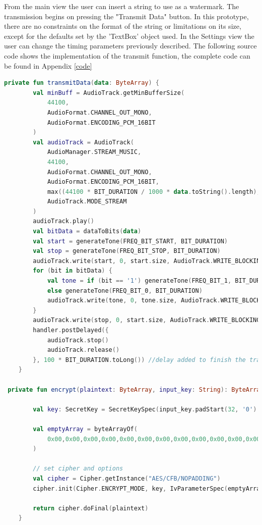 From the main view the user can insert a string to use as a watermark. The transmission begins on pressing the "Transmit Data" button. In this prototype, there are no constraints on the format of the string or limitations on its size, except for the defaults set by the 'TextBox' object used.
In the Settings view the user can change the timing parameters previously described. The following source code shows the implementation of the transmit function, the complete code can be found in Appendix \ref{code}

\begin{lstlisting}[language=Kotlin, caption=Code of the Transmit and encrypt Function.]        
    private fun transmitData(data: ByteArray) {
        val minBuff = AudioTrack.getMinBufferSize(
            44100,
            AudioFormat.CHANNEL_OUT_MONO,
            AudioFormat.ENCODING_PCM_16BIT
        )
        val audioTrack = AudioTrack(
            AudioManager.STREAM_MUSIC,
            44100,
            AudioFormat.CHANNEL_OUT_MONO,
            AudioFormat.ENCODING_PCM_16BIT,
            max((44100 * BIT_DURATION / 1000 * data.toString().length), minBuff),
            AudioTrack.MODE_STREAM
        )
        audioTrack.play()
        val bitData = dataToBits(data)
        val start = generateTone(FREQ_BIT_START, BIT_DURATION)
        val stop = generateTone(FREQ_BIT_STOP, BIT_DURATION)
        audioTrack.write(start, 0, start.size, AudioTrack.WRITE_BLOCKING)
        for (bit in bitData) {
            val tone = if (bit == '1') generateTone(FREQ_BIT_1, BIT_DURATION)
            else generateTone(FREQ_BIT_0, BIT_DURATION)
            audioTrack.write(tone, 0, tone.size, AudioTrack.WRITE_BLOCKING)
        }
        audioTrack.write(stop, 0, start.size, AudioTrack.WRITE_BLOCKING)
        handler.postDelayed({
            audioTrack.stop()
            audioTrack.release()
        }, 100 * BIT_DURATION.toLong()) //delay added to finish the transmission before stop
    }

 private fun encrypt(plaintext: ByteArray, input_key: String): ByteArray {

        val key: SecretKey = SecretKeySpec(input_key.padStart(32, '0').toByteArray(), "aes")

        val emptyArray = byteArrayOf(
            0x00,0x00,0x00,0x00,0x00,0x00,0x00,0x00,0x00,0x00,0x00,0x00,0x00,0x00,0x00,0x00
        )

        // set cipher and options
        val cipher = Cipher.getInstance("AES/CFB/NOPADDING")
        cipher.init(Cipher.ENCRYPT_MODE, key, IvParameterSpec(emptyArray))

        return cipher.doFinal(plaintext)
    }

    \end{lstlisting}
